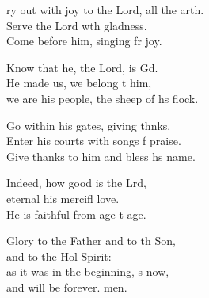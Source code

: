 \settowidth{\versewidth}{Cry out with joy to the Lord, all the earth. +}
\begin{psalmverse}%
  \begin{patverse}
ry out with joy to the Lord, all the arth.\Flex\\
Serve the Lord w\pointup{\i}th gladness.\Med\\
Come before him, singing fr joy.

Know that he, the Lord, is Gd.\Flex\\
He made us, we belong t him,\Med\\
we are his people, the sheep of h\pointup{\i}s flock.

Go within his gates, giving thnks.\Flex\\
Enter his courts with songs f praise.\Med\\
Give thanks to him and bless h\pointup{\i}s name.

Indeed, how good is the Lrd,\Flex\\
eternal his mercifl love.\Med\\
He is faithful from age t age.

Glory to the Father and to th Son,\Med\\
and to the Hol Spirit:\\
as it was in the beginning, \pointup{\i}s now,\Med\\
and will be forever. men.
  \end{patverse}
\end{psalmverse}
